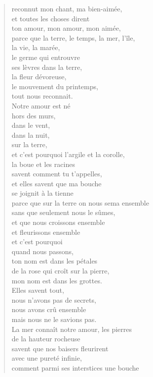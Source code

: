 \documentclass[11pt,a4paper]{book}
\begin{document}
\begin{verse}
reconnut mon chant, ma bien-aimée, \\
et toutes les choses dirent \\
ton amour, mon amour, mon aimée, \\
parce que la terre, le temps, la mer, l'île, \\
la vie, la marée, \\
le germe qui entrouvre \\
ses lèvres dans la terre, \\
la fleur dévoreuse, \\
le mouvement du printemps, \\
tout nous reconnait. \\
Notre amour est né \\
hors des murs, \\
dans le vent, \\
dans la nuit, \\
sur la terre, \\
et c'est pourquoi l'argile et la corolle, \\
la boue et les racines \\
savent comment tu t'appelles, \\
et elles savent que ma bouche \\
se joignit à la tienne \\
parce que sur la terre on nous sema ensemble \\
sans que seulement nous le sûmes, \\
et que nous croissons ensemble \\
et fleurissons ensemble \\
et c'est pourquoi \\
quand nous passons, \\
ton nom est dans les pétales \\
de la rose qui croît sur la pierre, \\
mon nom est dans les grottes. \\
Elles savent tout, \\
nous n'avons pas de secrets, \\
nous avons crû ensemble \\
mais nous ne le savions pas. \\
La mer connaît notre amour, les pierres \\
de la hauteur rocheuse \\
savent que nos baisers fleurirent \\
avec une pureté infinie, \\
comment parmi ses interstices une bouche \\

\end{verse}
\end{document}
